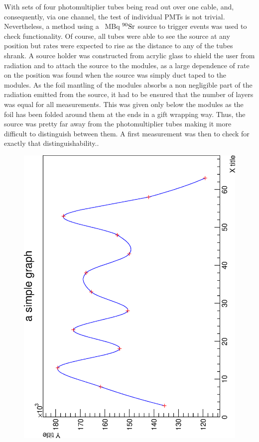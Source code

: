   With sets of four photomultiplier tubes being read out over one cable, and, consequently, via one channel, the test of individual PMTs is not trivial. Nevertheless, a method using a \SI{}{\mega\becquerel} $\rm ^{90}Sr$ source to trigger events was used to check functionality. Of course, all tubes were able to see the source at any position but rates were expected to rise as the distance to any of the tubes shrank. A source holder was constructed from acrylic glass to shield the user from radiation and to attach the source to the modules, as a large dependence of rate on the position was found when the source was simply duct taped to the modules. As the foil mantling of the modules absorbs a non negligible part of the radiation emitted from the source, it had to be ensured that the number of layers was equal for all measurements. This was given only below the modules as the foil has been folded around them at the ends in a gift wrapping way. Thus, the source was pretty far away from the photomultiplier 
tubes making it more difficult to distinguish between them. A first measurement was then to check for exactly that distinguishability..
  \begin{figure}
  	\includegraphics[angle = -90, width = 0.9 \textwidth]{graphics/cobalt/876_parallel_good.eps}
  \end{figure}


